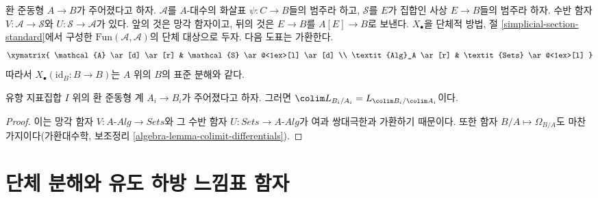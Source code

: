 \begin{remark}
\label{remark-variant-cotangent-complex}
환 준동형 $A\to B$가 주어졌다고 하자. $\mathcal{A}$를 $A$-대수의
화살표 $\psi:C\to B$들의 범주라 하고, $\mathcal{S}$를 $E$가 집합인
사상 $E\to B$들의 범주라 하자. 수반 함자
$V:\mathcal{A}\to\mathcal{S}$와 $U:\mathcal{S}\to\mathcal{A}$가 있다.
앞의 것은 망각 함자이고, 뒤의 것은 $E\to B$를 $A[E]\to B$로 보낸다.
$X_\bullet$을 단체적 방법, 절 \ref{simplicial-section-standard}에서 구성한
$\text{Fun}(\mathcal{A},\mathcal{A})$의 단체 대상으로 두자. 다음 도표는
가환한다.
$$
\xymatrix{
\mathcal{A} \ar[d] \ar[r] & \mathcal{S} \ar@<1ex>[l] \ar[d] \\
\textit{Alg}_A \ar[r] & \textit{Sets} \ar@<1ex>[l]
}
$$
따라서 $X_\bullet(\text{id}_B:B\to B)$는 $A$ 위의 $B$의 표준 분해와 같다.
\end{remark}

\begin{lemma}
\label{lemma-colimit-cotangent-complex}
유향 지표집합 $I$ 위의 환 준동형 계 $A_i\to B_i$가 주어졌다고 하자.
그러면 $\colim L_{B_i/A_i}=L_{\colim B_i/\colim A_i}$이다.
\end{lemma}

\begin{proof}
이는 망각 함자 $V:A\textit{-Alg}\to\textit{Sets}$와 그 수반 함자
$U:\textit{Sets}\to A\textit{-Alg}$가 여과 쌍대극한과 가환하기 때문이다.
또한 함자 $B/A\mapsto\Omega_{B/A}$도 마찬가지이다(가환대수학, 보조정리
\ref{algebra-lemma-colimit-differentials}).
\end{proof}





\section{단체 분해와 유도 하방 느낌표 함자}
\label{section-compute-L-pi-shriek}


